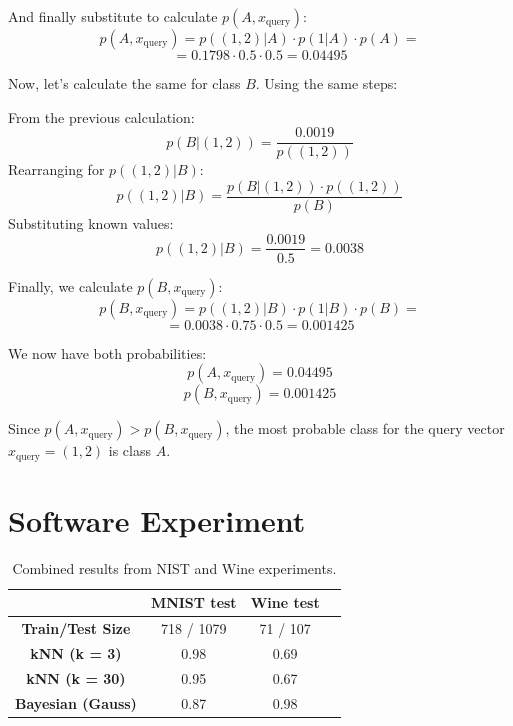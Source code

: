 \documentclass{article}
\begin{document}
And finally substitute to calculate \( p(A, x_\text{query}) \):
\[
p(A, x_\text{query}) = p((1,2) | A) \cdot p(1 | A) \cdot p(A) = 
\]
\[
= 0.1798 \cdot 0.5 \cdot 0.5 = 0.04495
\]

\bigskip

Now, let’s calculate the same for class \( B \). Using the same steps:

From the previous calculation:
\[
p(B | (1,2)) = \frac{0.0019}{p((1,2))}
\]
Rearranging for \( p((1,2) | B) \):
\[
p((1,2) | B) = \frac{p(B | (1,2)) \cdot p((1,2))}{p(B)}
\]
Substituting known values:
\[
p((1,2) | B) = \frac{0.0019}{0.5} = 0.0038
\]

Finally, we calculate \( p(B, x_\text{query}) \):
\[
p(B, x_\text{query}) = p((1,2) | B) \cdot p(1 | B) \cdot p(B) =
\]
\[
= 0.0038 \cdot 0.75 \cdot 0.5 = 0.001425
\]

\bigskip

We now have both probabilities:
\[
p(A, x_\text{query}) = 0.04495
\]
\[
p(B, x_\text{query}) = 0.001425
\]

Since \( p(A, x_\text{query}) > p(B, x_\text{query}) \), the most probable class for the query vector \( x_\text{query} = (1,2) \) is class \( A \).

\newpage

\section{Software Experiment} 
\begin{table}[h!]
\centering
\begin{tabular}{|c|c|c|c|}
\hline
\textbf{}          & \textbf{MNIST test} & \textbf{Wine test} \\ \hline
\textbf{Train/Test Size} & 718 / 1079 & 71 / 107                \\ \hline
\textbf{kNN (k = 3)}     & 0.98                     & 0.69                     \\ \hline
\textbf{kNN (k = 30)}    & 0.95                     & 0.67                     \\ \hline
\textbf{Bayesian (Gauss)}& 0.87                     & 0.98                     \\ \hline
\end{tabular}
\caption{Combined results from NIST and Wine experiments.}
\end{table}
\end{document}

